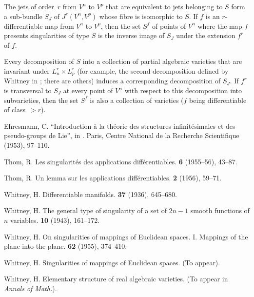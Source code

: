 \documentclass{article}
\theoremstyle{plain}
\theoremstyle{definition}
\newcommand{\oldpage}[1]{\marginpar{\footnotesize$\Big\vert$ \textit{p.~#1}}}
\begin{document}
The jets of order~$r$ from $V^n$ to $V^p$ that are equivalent to jets belonging to $S$ form a sub-bundle $S_J$ of $J^r(V^n,V^p)$ whose fibre is isomorphic to $S$.
If $f$ is an $r$-differentiable map from $V^n$ to $V^p$, then the set $S^f$ of points of $V^n$ where the map $f$ presents singularities of type $S$ is the inverse image of $S_J$ under the extension $f^r$ of $f$.

Every decomposition of $S$ into a collection of partial algebraic varieties that are invariant under $L_n^r\times L_p^r$ (for example, the second decomposition defined by Whitney in \cite{8}; there are others) induces a corresponding decomposition of $S_J$.
If $f^r$ is transversal to $S_J$ at every point of $V^n$ with respect to this decomposition into subvarieties, then the set $S^f$ is also a
\oldpage{7-05}
collection of varieties ($f$ being differentiable of class~$>r$).





\nocite{*}

\begin{thebibliography}{1}

  {\sc Ehresmann, C.}
  \newblock ``Introduction \`{a} la th\'{e}orie des structures infinit\'{e}simales et des pseudo-groups de Lie'', in
  .
  \newblock Paris, Centre National de la Recherche Scientifique (1953), 97--110.

  {\sc Thom, R.}
  \newblock Les singularit\'{e}s des applications diff\'{e}rentiables.
   \textbf{6} (1955--56), 43--87.

  {\sc Thom, R.}
  \newblock Un lemma sur les applications diff\'{e}rentiables.
   \textbf{2} (1956), 59--71.

  {\sc Whitney, H.}
  \newblock Differentiable manifolds.
   \textbf{37} (1936), 645--680.

  {\sc Whitney, H.}
  \newblock The general type of singularity of a set of $2n-1$ smooth functions of $n$ variables.
   \textbf{10} (1943), 161--172.

  {\sc Whitney, H.}
  \newblock On singularities of mappings of Euclidean spaces. I. Mappings of the plane into the plane.
   \textbf{62} (1955), 374--410.

  {\sc Whitney, H.}
  \newblock Singularities of mappings of Euclidean spaces.
  \newblock (To appear).

  {\sc Whitney, H.}
  \newblock Elementary structure of real algebraic varieties.
  \newblock (To appear in {\em Annals of Math.}).

\end{thebibliography}
\end{document}
